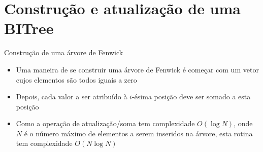 \section{Construção e atualização de uma BITree}

\begin{frame}[fragile]{Construção de uma árvore de Fenwick}

    \begin{itemize}
        \item Uma maneira de se construir uma árvore de Fenwick é começar com um vetor cujos
            elementos são todos iguais a zero

        \item Depois, cada valor a ser atribuído à $i$-ésima posição deve ser somado a esta
            posição

        \item Como a operação de atualização/soma tem complexidade $O(\log N)$, onde $N$ é o 
            número máximo de elementos a serem inseridos na árvore, esta rotina tem complexidade
            $O(N\log N)$

    \end{itemize}

\end{frame}
